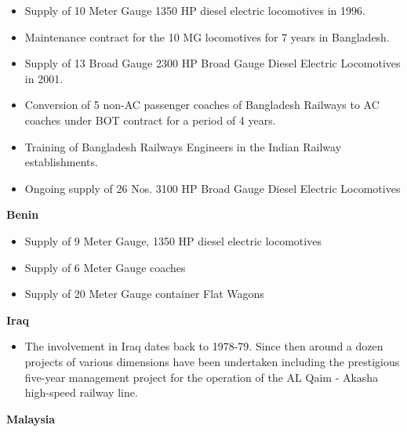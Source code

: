 \begin{itemize}
\item {\color[rgb]{0.0,0.0,0.039215688}
Supply of 10 Meter Gauge 1350 HP diesel electric locomotives in 1996.}
\item {\color[rgb]{0.0,0.0,0.039215688}
Maintenance contract for the 10 MG locomotives for 7 years in Bangladesh.}
\item {\color[rgb]{0.0,0.0,0.039215688}
Supply of 13 Broad Gauge 2300 HP Broad Gauge Diesel Electric Locomotives in 2001. }
\item {\color[rgb]{0.0,0.0,0.039215688}
Conversion of 5 non-AC passenger coaches of Bangladesh Railways to AC coaches under BOT contract for a period of 4
years. }
\item {\color[rgb]{0.0,0.0,0.039215688}
Training of Bangladesh Railways Engineers in the Indian Railway establishments. }
\item {\color[rgb]{0.0,0.0,0.039215688}
Ongoing supply of 26 Nos. 3100 HP Broad Gauge Diesel Electric Locomotives }
\end{itemize}

\bigskip

{\color[rgb]{0.0,0.0,0.039215688}
\textbf{Benin}}


\bigskip

\begin{itemize}
\item {\color[rgb]{0.0,0.0,0.039215688}
Supply of 9 Meter Gauge, 1350 HP diesel electric locomotives }
\item {\color[rgb]{0.0,0.0,0.039215688}
Supply of 6 Meter Gauge coaches}
\item {\color[rgb]{0.0,0.0,0.039215688}
Supply of 20 Meter Gauge container Flat Wagons }
\end{itemize}

\bigskip

{\color[rgb]{0.0,0.0,0.039215688}
\textbf{Iraq }}


\bigskip

\begin{itemize}
\item {\color[rgb]{0.0,0.0,0.039215688}
The involvement in Iraq dates back to 1978-79. Since then around a dozen projects of various dimensions have been
undertaken including the prestigious five-year management project for the operation of the AL Qaim - Akasha high-speed
railway line. \ }
\end{itemize}

\bigskip

{\color[rgb]{0.0,0.0,0.039215688}
\textbf{Malaysia}}


